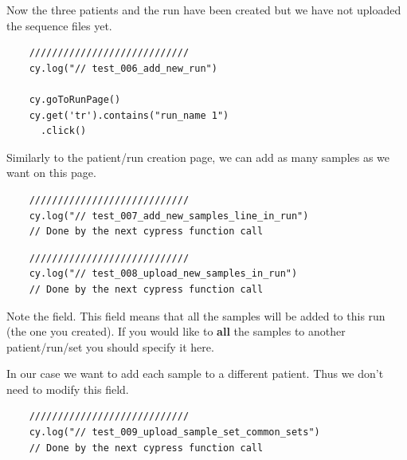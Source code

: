 Now the three patients and the run have been created but we have not uploaded
the sequence files yet.

\begin{verbatim}
    ////////////////////////////
    cy.log("// test_006_add_new_run")

    cy.goToRunPage()
    cy.get('tr').contains("run_name 1")
      .click()

\end{verbatim}

Similarly to the patient/run creation page, we can add as many samples as we
want on this page.

\begin{verbatim}
    ////////////////////////////
    cy.log("// test_007_add_new_samples_line_in_run")
    // Done by the next cypress function call

\end{verbatim}

\begin{verbatim}
    ////////////////////////////
    cy.log("// test_008_upload_new_samples_in_run")
    // Done by the next cypress function call

\end{verbatim}

Note the  field. This field means that all the samples will
be added to this run (the one you created). If you would like to \textbf{all}
the samples to another patient/run/set you should specify it here.

In our case we want to add each sample to a different patient. Thus we don't
need to modify this field.

\begin{verbatim}
    ////////////////////////////
    cy.log("// test_009_upload_sample_set_common_sets")
    // Done by the next cypress function call

\end{verbatim}

